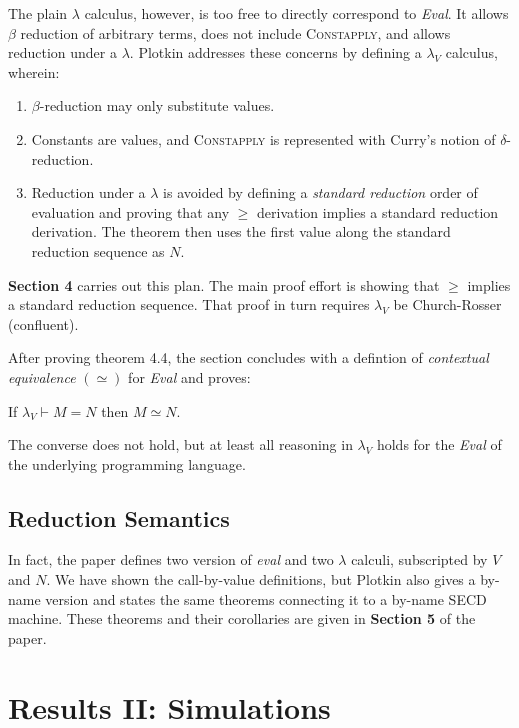 \documentclass{article}
\begin{document}
The plain $\lambda$ calculus, however, is too free to directly correspond to \emph{Eval}.
It allows $\beta$ reduction of arbitrary terms, does not include \textsc{Constapply}, and allows reduction under a $\lambda$.
Plotkin addresses these concerns by defining a $\lambda_V$ calculus, wherein:
\begin{enumerate}
\item
  $\beta$-reduction may only substitute values.
\item
  Constants are values, and \textsc{Constapply} is represented with Curry's notion of $\delta$-reduction.
\item
  Reduction under a $\lambda$ is avoided by defining a \emph{standard reduction} order of evaluation and proving that any $\ge$ derivation implies a standard reduction derivation.
  The theorem then uses the first value along the standard reduction sequence as $N$.
\end{enumerate}

{\bf Section 4} carries out this plan.
The main proof effort is showing that $\ge$ implies a standard reduction sequence.
That proof in turn requires $\lambda_V$ be Church-Rosser (confluent).

After proving theorem 4.4, the section concludes with a defintion of \emph{contextual equivalence} $(\simeq)$ for \emph{Eval} and proves:

\begin{theorem}
If $\lambda_V \vdash M = N$ then $M \simeq N$.
\end{theorem}

The converse does not hold, but at least all reasoning in $\lambda_V$ holds for the \emph{Eval} of the underlying programming language.


\subsection{Reduction Semantics}

In fact, the paper defines two version of \emph{eval} and two $\lambda$ calculi, subscripted by $V$ and $N$.
We have shown the call-by-value definitions, but Plotkin also gives a by-name version and states the same theorems connecting it to a by-name SECD machine.
These theorems and their corollaries are given in {\bf Section 5} of the paper.


\section{Results II: Simulations}
\end{document}

